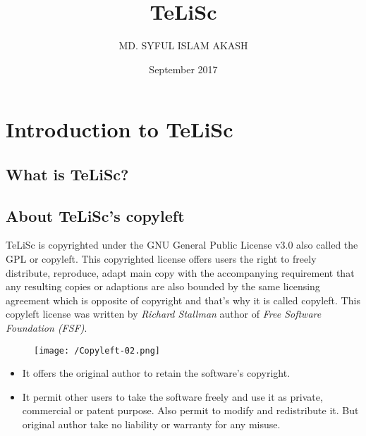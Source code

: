 \documentclass[a4paper,12pt]{book}
\title{TeLiSc}
\author{MD. SYFUL ISLAM AKASH}
\date{September 2017}
\begin{document}
\frontmatter
\tableofcontents{}

\maketitle

 
\chapter{Introduction to TeLiSc}

\section{What is TeLiSc?}

\section{About TeLiSc’s copyleft}

TeLiSc is copyrighted under the GNU General Public License v3.0 also called the GPL or copyleft. This copyrighted license offers users the right to freely distribute, reproduce, adapt main copy with the accompanying requirement that any resulting copies or adaptions are also bounded by the same licensing agreement which is opposite of copyright and that’s why it is called copyleft. This copyleft license was written by \textit{Richard Stallman} author of \textit{Free Software Foundation (FSF)}.

\begin{figure}
\centering
\texttt{[image: /Copyleft-02.png]}
\end{figure}

\begin{itemize}
\item It offers the original author to retain the software’s copyright.
\item 	It permit other users to take the software freely and use it as private, commercial or patent purpose. Also permit to modify and redistribute it. But original author take no liability or warranty for any misuse. 
\end{itemize}
\end{document}
